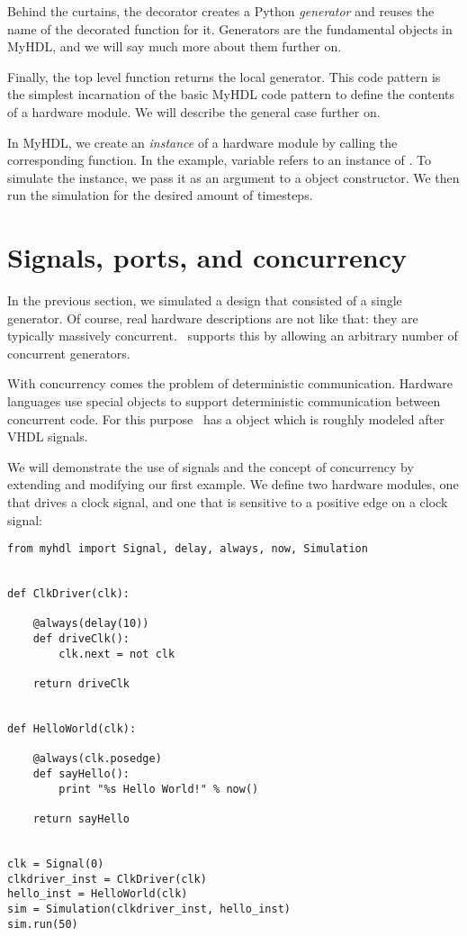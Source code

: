 Behind the curtains, the  decorator creates a Python
\emph{generator} and reuses the name of the decorated function for
it. Generators are the fundamental objects in MyHDL, and we will say
much more about them further on.

Finally, the top level function returns the local generator. This code
pattern is the simplest incarnation of the basic MyHDL code pattern
to define the contents of a hardware module. We will describe the
general case further on.

In MyHDL, we create an \emph{instance} of a hardware module by calling
the corresponding function. In the example, variable  refers
to an instance of .  To simulate the instance, we
pass it as an argument to a  object constructor.  We
then run the simulation for the desired amount of timesteps.

\section{Signals, ports, and concurrency \label{intro-conc}}

In the previous section, we simulated a design that consisted
of a single generator. Of course,
real hardware descriptions are not like that: they are
typically massively concurrent. \myhdl\ supports this by allowing an
arbitrary number of concurrent generators. 

With concurrency comes the problem of deterministic
communication. Hardware languages use special objects to
support deterministic communication between concurrent code.
For this purpose \myhdl\
has a  object which is roughly modeled after VHDL
signals.

We will demonstrate the use of signals and the concept of concurrency
by extending and modifying our first example. We define two hardware
modules, one that drives a clock signal, and one that is sensitive
to a positive edge on a clock signal:


\begin{verbatim}
from myhdl import Signal, delay, always, now, Simulation


def ClkDriver(clk):

    @always(delay(10))
    def driveClk():
        clk.next = not clk

    return driveClk


def HelloWorld(clk):
    
    @always(clk.posedge)
    def sayHello():
        print "%s Hello World!" % now()

    return sayHello


clk = Signal(0)
clkdriver_inst = ClkDriver(clk)
hello_inst = HelloWorld(clk)
sim = Simulation(clkdriver_inst, hello_inst)
sim.run(50)
\end{verbatim}

